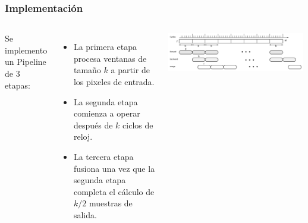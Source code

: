\frame
{
\frametitle{Implementación}
\begin{columns}
Se implemento un Pipeline de 3 etapas:
\begin{itemize}
\item La primera etapa procesa ventanas de tamaño $k$ a partir de los pixeles de entrada. 
\item La segunda etapa comienza a operar después de $k$ ciclos de reloj.
\item La tercera etapa fusiona una vez que la segunda etapa completa el cálculo de $k/2$ muestras de salida.
\end{itemize}

\begin{center}
    \includegraphics[width=0.99\textwidth]{Figs/2014_Arq_Umbralizacion05}
\end{center}      
\end{columns}

}



